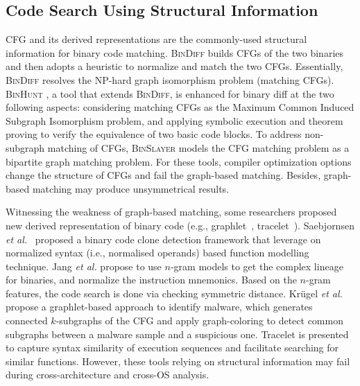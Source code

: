 \subsection{Code Search Using Structural Information}  %
CFG and its derived representations are the commonly-used structural information for binary code matching.
\textsc{\small BinDiff} \cite{DBLP:conf/dimva/Flake04} %
builds CFGs of the two binaries and then adopts a heuristic to normalize and match the two CFGs.  Essentially, \textsc{\small BinDiff} resolves the NP-hard graph isomorphism problem (matching CFGs). %
\textsc{\small BinHunt} \cite{DBLP:conf/icics/GaoRS08}, a tool that extends \textsc{\small BinDiff}, is enhanced for binary diff at the two following aspects:  considering matching CFGs as the Maximum Common Induced Subgraph Isomorphism problem, and applying symbolic execution and theorem proving to verify the equivalence of two basic code blocks. %
To address non-subgraph matching of CFGs, \textsc{\small BinSlayer} \cite{DBLP:conf/popl/BourquinKR13} models the CFG matching problem as a bipartite graph matching problem.
For these tools, compiler optimization options change the structure of CFGs and fail the graph-based matching. Besides, graph-based matching may produce unsymmetrical results.

Witnessing the weakness of graph-based matching, some researchers proposed new derived representation of binary code (e.g., graphlet~\cite{DBLP:conf/raid/KrugelKMRV05}, tracelet~\cite{DBLP:conf/pldi/DavidY14}).   Saebjornsen \emph{et al.}~\cite{saebjornsen2009detecting} proposed a binary code clone detection framework that leverage on normalized syntax (i.e., normalised operands) based function modelling technique.
Jang \emph{et al.} \cite{DBLP:conf/uss/JangWB13} propose to use $n$-gram models to get the complex lineage for binaries, and normalize the instruction mnemonics. Based on the $n$-gram features, the code search is done via checking symmetric distance. %
Kr{\"{u}}gel \emph{et al.}~\cite{DBLP:conf/raid/KrugelKMRV05} propose a graphlet-based approach to identify malware, which generates connected  $k$-subgraphs of the CFG and apply graph-coloring to detect common subgraphs between a malware sample and a suspicious one. Tracelet \cite{DBLP:conf/pldi/DavidY14} is presented to capture syntax similarity of execution sequences and facilitate searching for similar functions. However, these tools relying on structural information may fail during cross-architecture and cross-OS analysis.

